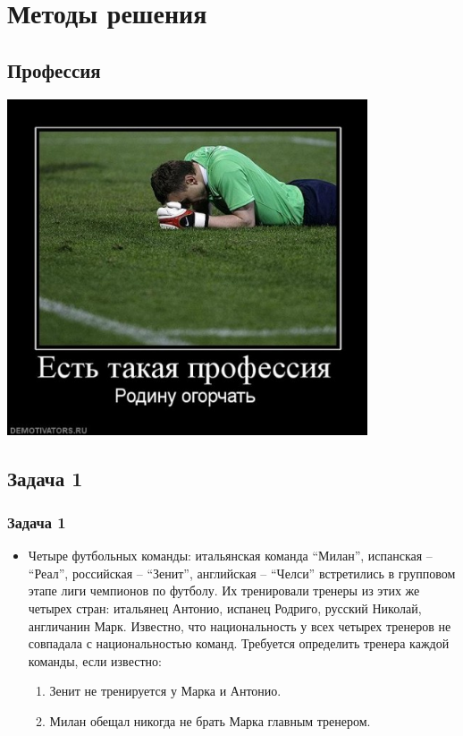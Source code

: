 \documentclass[compress,red]{beamer}
\begin{document}
\section{Методы решения}

\subsection{Профессия}
\begin{frame}[fragile]
  \centerline{\includegraphics[width=0.8\textwidth]{images/soccer.jpg}}
\end{frame}

\subsection{Задача 1}
\begin{frame}[fragile]
  \frametitle{Задача 1}
  \begin{itemize}
    \item Четыре футбольных команды: итальянская команда ``Милан'', испанская – ``Реал'', российская – ``Зенит'', английская – ``Челси'' встретились в групповом этапе лиги чемпионов по футболу. Их тренировали тренеры из этих же четырех стран: итальянец Антонио, испанец Родриго, русский Николай, англичанин Марк. Известно, что национальность у всех четырех тренеров не совпадала с национальностью команд. Требуется определить тренера каждой команды, если известно: 
    \begin{enumerate}
      \item Зенит не тренируется у Марка и Антонио. 
      \item Милан обещал никогда не брать Марка главным тренером.
    \end{enumerate}
  \end{itemize}
\end{frame}
\end{document}
